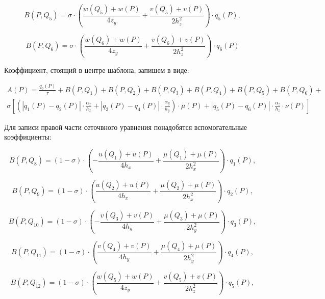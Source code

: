 \documentclass[12pt]{article}
\begin{document}
\begin{equation*}
	B(P, Q_5) = \sigma \cdot \left( \frac{w(Q_5) + w(P) }{4z_y}  +	
	\frac{v(Q_5)+ v(P)}{2h_z^2} \right) \cdot q_5(P), 
\end{equation*}

\begin{equation*}
	B(P, Q_6) = \sigma \cdot \left( \frac{w(Q_6) + w(P) }{4z_y}  +	
	\frac{v(Q_6)+ v(P)}{2h_z^2} \right) \cdot q_6(P) 
\end{equation*}

Коэффициент, стоящий в центре шаблона, запишем в виде:

\begin{multline*}
	A(P)=\frac{q_0(P)}{\tau} + B(P, Q_1) + 	B(P, Q_2) + B(P, Q_3) + B(P, Q_4) + B(P, Q_5) + B(P, Q_6) + \\
	\sigma \left[ \left( | q_1(P) - q_2(P)| \cdot \frac{\alpha_x}{h_x} + 
	| q_3(P) - q_4(P)| \cdot \frac{\alpha_y}{h_y}  \right) \cdot \mu(P) + | q_5(P) - q_6(P)| \cdot \frac{\alpha_z}{h_z} \cdot \nu(P) \right] 
\end{multline*}	

Для записи правой части сеточвного уравнения понадобятся вспомогательные коэффициенты:

\begin{equation*}
	B(P, Q_8) = (1-\sigma) \cdot \left( -\frac{u(Q_1) + u(P) }{4h_x}  +	
	\frac{\mu(Q_1)+ \mu(P)}{2h_x^2} \right) \cdot q_1(P), 
\end{equation*}

\begin{equation*}
	B(P, Q_9) = (1-\sigma) \cdot \left( \frac{u(Q_2) + u(P) }{4h_x}  +	
	\frac{\mu(Q_2)+ \mu(P)}{2h_x^2} \right) \cdot q_2(P), 
\end{equation*}

\begin{equation*}
	B(P, Q_{10}) = (1-\sigma) \cdot \left( -\frac{v(Q_3) + v(P) }{4h_y}  +	
	\frac{\mu(Q_3)+ \mu(P)}{2h_y^2} \right) \cdot q_3(P), 
\end{equation*}

\begin{equation*}
	B(P, Q_{11}) = (1-\sigma) \cdot \left( \frac{v(Q_4) + v(P) }{4h_y}  +	
	\frac{\mu(Q_4)+ \mu(P)}{2h_y^2} \right) \cdot q_4(P), 
\end{equation*}

\begin{equation*}
	B(P, Q_{12}) = (1-\sigma) \cdot \left( \frac{w(Q_5) + w(P) }{4z_y}  +	
	\frac{v(Q_5)+ v(P)}{2h_z^2} \right) \cdot q_5(P), 
\end{equation*}
\end{document}
